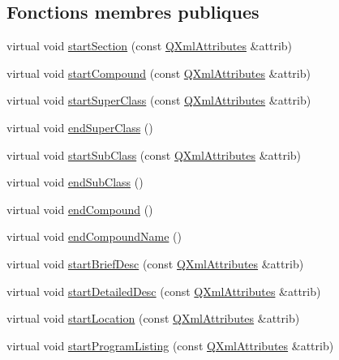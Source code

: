 \subsection*{Fonctions membres publiques}
\begin{DoxyCompactItemize}
\item 
virtual void \hyperlink{class_compound_handler_ae312a5c3352e9feccb8f31c04644331d}{start\+Section} (const \hyperlink{class_q_xml_attributes}{Q\+Xml\+Attributes} \&attrib)
\item 
virtual void \hyperlink{class_compound_handler_a2f898580dc874e0b3feb2a44585ca7b8}{start\+Compound} (const \hyperlink{class_q_xml_attributes}{Q\+Xml\+Attributes} \&attrib)
\item 
virtual void \hyperlink{class_compound_handler_a8fd0c8e7cf8423447ee429cfe09e596c}{start\+Super\+Class} (const \hyperlink{class_q_xml_attributes}{Q\+Xml\+Attributes} \&attrib)
\item 
virtual void \hyperlink{class_compound_handler_a3f4b5ca118ba0203e419fbc1118898f4}{end\+Super\+Class} ()
\item 
virtual void \hyperlink{class_compound_handler_ada50dbe513b9110ee8eb7980f5ef4295}{start\+Sub\+Class} (const \hyperlink{class_q_xml_attributes}{Q\+Xml\+Attributes} \&attrib)
\item 
virtual void \hyperlink{class_compound_handler_a3516537c3eb29cf31fcf28f54714c7d2}{end\+Sub\+Class} ()
\item 
virtual void \hyperlink{class_compound_handler_aff575ded1bcc312bdc61c4ca8a156575}{end\+Compound} ()
\item 
virtual void \hyperlink{class_compound_handler_af66d0f53471552df4c60d0f0f82d3ce7}{end\+Compound\+Name} ()
\item 
virtual void \hyperlink{class_compound_handler_a44420765335442b119e2b65a219483d5}{start\+Brief\+Desc} (const \hyperlink{class_q_xml_attributes}{Q\+Xml\+Attributes} \&attrib)
\item 
virtual void \hyperlink{class_compound_handler_ac35ca9b5a01a8cc6c43923a1ce4a855d}{start\+Detailed\+Desc} (const \hyperlink{class_q_xml_attributes}{Q\+Xml\+Attributes} \&attrib)
\item 
virtual void \hyperlink{class_compound_handler_a4606e031f1530c54d598f4d8b201dcc8}{start\+Location} (const \hyperlink{class_q_xml_attributes}{Q\+Xml\+Attributes} \&attrib)
\item 
virtual void \hyperlink{class_compound_handler_a76eb6de8397491aeea84d65bb916869e}{start\+Program\+Listing} (const \hyperlink{class_q_xml_attributes}{Q\+Xml\+Attributes} \&attrib)

\end{DoxyCompactItemize}
